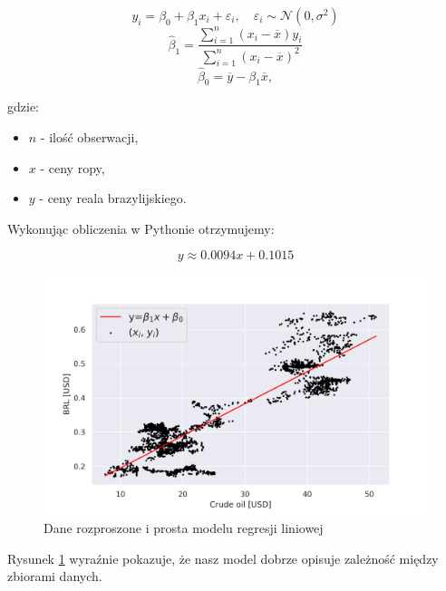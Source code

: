 \documentclass[fleqn]{article}
\begin{document}
    $$y_i = \beta_{0}+\beta_{1}x_i+\varepsilon_i,\quad \varepsilon_i\sim \mathcal{N}(0,\sigma^2)$$
    $$\hat \beta_{1} = \frac{\sum_{i=1}^{n} (x_{i} - \overline{x})y_{i}}{\sum_{i=1}^{n} (x_{i} - \overline{x})^2}$$
    $$\hat \beta_{0} = \overline{y} - \beta_{1} \overline{x},$$

    gdzie:
    \begin{itemize}
        \item[] $n$ - ilość obserwacji,
        \item[] $x$ - ceny ropy,
        \item[] $y$ - ceny reala brazylijskiego.    
    \end{itemize}
        

    \noindent Wykonując obliczenia w Pythonie otrzymujemy:

    $$y \approx 0.0094x + 0.1015$$

    \vskip -0.2in
    
    \begin{figure}[H]
        \includegraphics[width=15cm]{fig2.png}
        \centering
        \caption{Dane rozproszone i prosta modelu regresji liniowej}
        \label{2}
    \end{figure}


    \noindent Rysunek \ref{2} wyraźnie pokazuje, że nasz model dobrze opisuje zależność między zbiorami danych.
\end{document}
